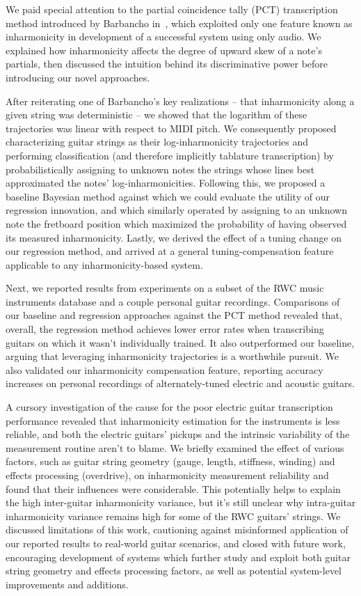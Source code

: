 \documentclass[12pt]{cmuthesis}
\begin{document}
We paid special attention to the partial coincidence tally (PCT) transcription method introduced by Barbancho in~\cite{barbanchoi2012}, which exploited only one feature known as inharmonicity in development of a successful system using only audio. We explained how inharmonicity affects the degree of upward skew of a note's partials, then discussed the intuition behind its discriminative power before introducing our novel approaches.

After reiterating one of Barbancho's key realizations -- that inharmonicity along a given string was deterministic -- we showed that the logarithm of these trajectories was linear with respect to MIDI pitch. We consequently proposed characterizing guitar strings as their log-inharmonicity trajectories and performing classification (and therefore implicitly tablature transcription) by probabilistically assigning to unknown notes the strings whose lines best approximated the notes' log-inharmonicities. Following this, we proposed a baseline Bayesian method against which we could evaluate the utility of our regression innovation, and which similarly operated by assigning to an unknown note the fretboard position which maximized the probability of having observed its measured inharmonicity. Lastly, we derived the effect of a tuning change on our regression method, and arrived at a general tuning-compensation feature applicable to any inharmonicity-based system.

Next, we reported results from experiments on a subset of the RWC music instruments database and a couple personal guitar recordings. Comparisons of our baseline and regression approaches against the PCT method revealed that, overall, the regression method achieves lower error rates when transcribing guitars on which it wasn't individually trained. It also outperformed our baseline, arguing that leveraging inharmonicity trajectories is a worthwhile pursuit. We also validated our inharmonicity compensation feature, reporting accuracy increases on personal recordings of alternately-tuned electric and acoustic guitars.

A cursory investigation of the cause for the poor electric guitar transcription performance revealed that inharmonicity estimation for the instruments is less reliable, and both the electric guitars' pickups and the intrinsic variability of the measurement routine aren't to blame. We briefly examined the effect of various factors, such as guitar string geometry (gauge, length, stiffness, winding) and effects processing (overdrive), on inharmonicity measurement reliability and found that their influences were considerable. This potentially helps to explain the high inter-guitar inharmonicity variance, but it's still unclear why intra-guitar inharmonicity variance remains high for some of the RWC guitars' strings. We discussed limitations of this work, cautioning against misinformed application of our reported results to real-world guitar scenarios, and closed with future work, encouraging development of systems which further study and exploit both guitar string geometry and effects processing factors, as well as potential system-level improvements and additions.
\end{document}
